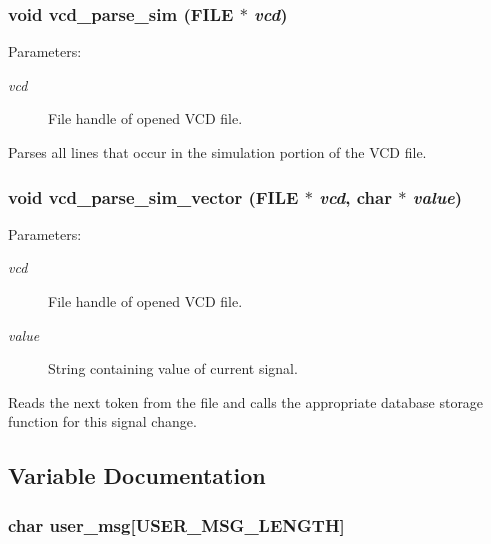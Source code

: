 \subsubsection{\setlength{\rightskip}{0pt plus 5cm}void vcd\_\-parse\_\-sim (FILE $\ast$ {\em vcd})}\label{vcd_8c_a6}


\begin{Desc}
\item[Parameters: ]\par
\begin{description}
\item[{\em 
vcd}]File handle of opened VCD file.\end{description}
\end{Desc}
Parses all lines that occur in the simulation portion of the VCD file. 
\subsubsection{\setlength{\rightskip}{0pt plus 5cm}void vcd\_\-parse\_\-sim\_\-vector (FILE $\ast$ {\em vcd}, char $\ast$ {\em value})}\label{vcd_8c_a5}


\begin{Desc}
\item[Parameters: ]\par
\begin{description}
\item[{\em 
vcd}]File handle of opened VCD file. \item[{\em 
value}]String containing value of current signal.\end{description}
\end{Desc}
Reads the next token from the file and calls the appropriate database storage function for this signal change. 

\subsection{Variable Documentation}
\subsubsection{\setlength{\rightskip}{0pt plus 5cm}char user\_\-msg[USER\_\-MSG\_\-LENGTH]}\label{vcd_8c_a0}


